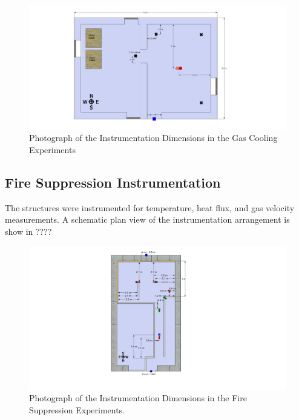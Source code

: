 \documentclass[12pt,oneside]{book}
\begin{document}
\begin{figure}[!ht]
	\includegraphics[width=6in]{../Figures/Pictures/DelCoBurnBuildingInstrumentation}
	\caption{Photograph of the Instrumentation Dimensions in the Gas Cooling Experiments}
	\label{fig:Gas_Cooling_Instrumentation_Dimensions}
\end{figure}

\subsection{Fire Suppression Instrumentation}
\label{subsec:Fire_Suppression_Instrumentation}

The structures were instrumented for temperature, heat flux, and gas velocity measurements.  A schematic plan view of the instrumentation arrangement is show in ???? 

\begin{figure}[!ht]
	\includegraphics[width=6in]{../Figures/Pictures/DelCoSingleStoryInstrumentationDimensions}
	\caption{Photograph of the Instrumentation Dimensions in the Fire Suppression Experiments.}
	\label{fig:Fire_Suppression_Instrumentation_Dimensions}
\end{figure}
\end{document}
